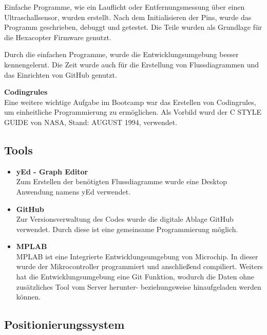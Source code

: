   Einfache Programme, wie ein Lauflicht oder Entfernungsmessung über einen Ultraschallsensor, wurden erstellt.
  Nach dem Initialisieren der Pins, wurde das Programm geschrieben, debuggt und getestet. 
  Die Teile wurden als Grundlage für die Hexacopter Firmware genutzt.

  Durch die einfachen Programme, wurde die Entwicklungsumgebung besser kennengelernt. Die Zeit wurde auch für die Erstellung von Flussdiagrammen und das Einrichten von GitHub genutzt.

  \textbf{Codingrules}\\
  Eine weitere wichtige Aufgabe im Bootcamp war das Erstellen von Codingrules, um einheitliche Programmierung zu ermöglichen. 
  Als Vorbild wurd der C STYLE GUIDE von NASA, Stand: AUGUST 1994, verwendet. \cite{NasaCGuide}
  
  \subsection{Tools}

    \begin{itemize}
      \item \textbf{yEd - Graph Editor}\\ 
      Zum Erstellen der benötigten Flussdiagramme wurde eine Desktop Anwendung namens yEd verwendet. \cite{Tool_yed}
      \item \textbf{GitHub}\\ 
      Zur Versionsverwaltung des Codes wurde die digitale Ablage GitHub verwendet. Durch diese ist eine gemeinsame Programmierung möglich.\cite{Tool_github}
      \item \textbf{MPLAB}\\ 
      MPLAB ist eine Integrierte Entwicklungsumgebung von Microchip. In dieser wurde der Mikrocontroller programmiert und anschließend compiliert. Weiters hat die Entwicklungsumgebung eine Git Funktion, wodurch die Daten ohne zusätzliches Tool vom Server herunter- beziehungsweise hinaufgeladen werden können. \cite{Tool_mplab}
    \end{itemize}

  \subsection{Positionierungssystem}

